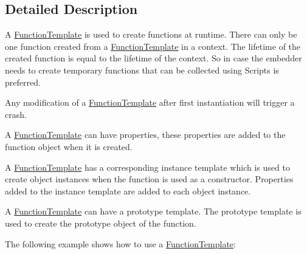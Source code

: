 \subsection{Detailed Description}
A \hyperlink{classv8_1_1_function_template}{Function\+Template} is used to create functions at runtime. There can only be one function created from a \hyperlink{classv8_1_1_function_template}{Function\+Template} in a context. The lifetime of the created function is equal to the lifetime of the context. So in case the embedder needs to create temporary functions that can be collected using Scripts is preferred.

Any modification of a \hyperlink{classv8_1_1_function_template}{Function\+Template} after first instantiation will trigger a crash.

A \hyperlink{classv8_1_1_function_template}{Function\+Template} can have properties, these properties are added to the function object when it is created.

A \hyperlink{classv8_1_1_function_template}{Function\+Template} has a corresponding instance template which is used to create object instances when the function is used as a constructor. Properties added to the instance template are added to each object instance.

A \hyperlink{classv8_1_1_function_template}{Function\+Template} can have a prototype template. The prototype template is used to create the prototype object of the function.

The following example shows how to use a \hyperlink{classv8_1_1_function_template}{Function\+Template}\+:



